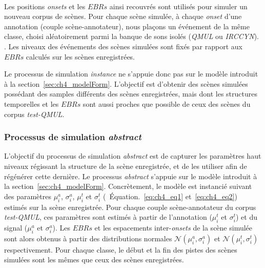  \\

Les positions \emph{onsets} et les $EBRs$ ainsi recouvrés  sont utilisés  pour simuler un nouveau corpus de scènes. Pour chaque scène simulée, à chaque \emph{onset} d'une annotation (couple scène-annotateur), nous plaçons un événement de la même classe, choisi aléatoirement parmi la banque de sons isolés (\emph{QMUL} ou \emph{IRCCYN}).  . Les niveaux des événements des scènes simulées sont fixés par rapport aux $EBRs$ calculés sur les scènes enregistrées. 

Le processus de simulation \emph{instance} ne s'appuie donc pas sur le modèle introduit à la section~\ref{sec:ch4_modelForm}. L'objectif est d’obtenir des scènes simulées possédant des samples différents des scènes enregistrées, mais dont les structures temporelles et les $EBRs$ sont aussi proches que possible de ceux des scènes du corpus \emph{test-QMUL}.

\subsubsection{Processus de simulation \emph{abstract}}
\label{sec:ch7_simuProcessAbstract}

L'objectif du processus de simulation \emph{abstract} est de capturer les paramètres haut niveaux régissant la structure de la scène enregistrée, et de les utiliser afin de régénérer cette dernière. Le processus \emph{abstract} s'appuie sur le modèle introduit à la section~\ref{sec:ch4_modelForm}. Concrètement, le modèle est instancié suivant des paramètres $\mu_i^a$, $\sigma_i^a$, $\mu_i^t$ et $\sigma_i^t$ (\cf~Équation.~\ref{eq:ch4_eq1} et~\ref{eq:ch4_eq2}) estimés sur la scène enregistrée. Pour chaque couple scène-annotateur du corpus  \emph{test-QMUL}, ces paramètres sont estimés à partir de l'annotation ($\mu_i^t$ et $\sigma_i^t$) et du signal ($\mu_i^a$ et $\sigma_i^a$). Les $EBRs$ et les espacements inter-\emph{onsets} de la scène simulée sont alors obtenus à partir des distributions normales $\mathcal{N}(\mu_i^a,\sigma_i^a)$ et $\mathcal{N}(\mu_i^t,\sigma_i^t)$ respectivement. Pour chaque classe, le début et la fin des pistes des scènes simulées sont les mêmes que ceux des scènes enregistrées.

